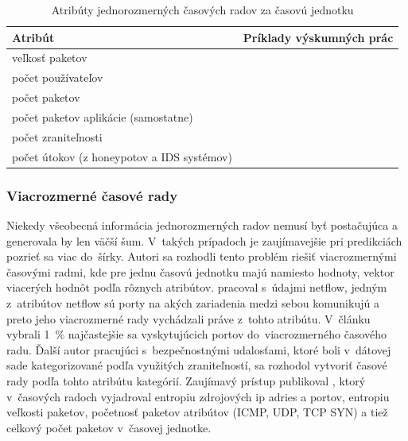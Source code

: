 \documentclass[thesismargins, thesislinespacing, openright, upjsfrontpage]{rnthesis}
\begin{document}
\begin{table}[]
    \centering
    \begin{tabular}{ | p{6cm} | p{8cm} | }
        \hline \textbf{Atribút} & \textbf{Príklady výskumných prác} \\
        \hline
        \hline veľkosť paketov & \cite{jiang2004detecting, wei2012intrusion,madan2018predicting, sang2002predictability,wang2008internet,hasegawa2001applications,cortez2012multi,hasegawa2001applications,papagiannaki2005long} \\
        \hline počet používateľov & \cite{jiang2004detecting} \\
        \hline počet paketov & \cite{jiang2004detecting} \\
        \hline počet paketov aplikácie \newline (samostatne) & \cite{jiang2004detecting} \\
        \hline počet zraniteľnosti & \cite{tang2016exploiting,roumani2015time,tang2018disclosure,tang2017big,pokhrel2017cybersecurity,werner2017time} \\
        \hline počet útokov \newline (z honeypotov a IDS systémov) & \cite{fang2019deep,zhan2015predicting,condon2008analysis,fang2019deep,condon2008analysis} \\
        \hline
    \end{tabular}
    \caption{Atribúty jednorozmerných časových radov za časovú jednotku}
    \label{tab:ts_uni}
\end{table}

\subsubsection{Viacrozmerné časové rady}

Niekedy všeobecná informácia jednorozmerných radov nemusí byť postačujúca a generovala by len väčší šum. V~takých prípadoch je zaujímavejšie pri predikciách pozrieť sa viac do~šírky. Autori \cite{shin2013advanced,ramaki2015real,marchette1999statistical} sa rozhodli tento problém riešiť viacrozmernými časovými radmi, kde pre jednu časovú jednotku majú namiesto hodnoty, vektor viacerých hodnôt podľa rôznych atribútov. \cite{marchette1999statistical} pracoval s~údajmi netflow, jedným z~atribútov netflow sú porty na akých zariadenia medzi sebou komunikujú a preto jeho viacrozmerné rady vychádzali práve z~tohto atribútu. V~článku vybrali 1~\% najčastejšie sa vyskytujúcich portov do~viacrozmerného časového radu. Ďalší autor pracujúci s~bezpečnostnými udalosťami, ktoré boli v~dátovej sade kategorizované podľa využitých zraniteľností, sa rozhodol vytvoriť časové rady podľa tohto atribútu kategórií. Zaujímavý prístup publikoval \cite{shin2013advanced}, ktorý v~časových radoch vyjadroval entropiu zdrojových ip adries a portov, entropiu veľkosti paketov, početnosť paketov atribútov (ICMP, UDP, TCP SYN) a tiež celkový počet paketov v~časovej jednotke.
\end{document}
